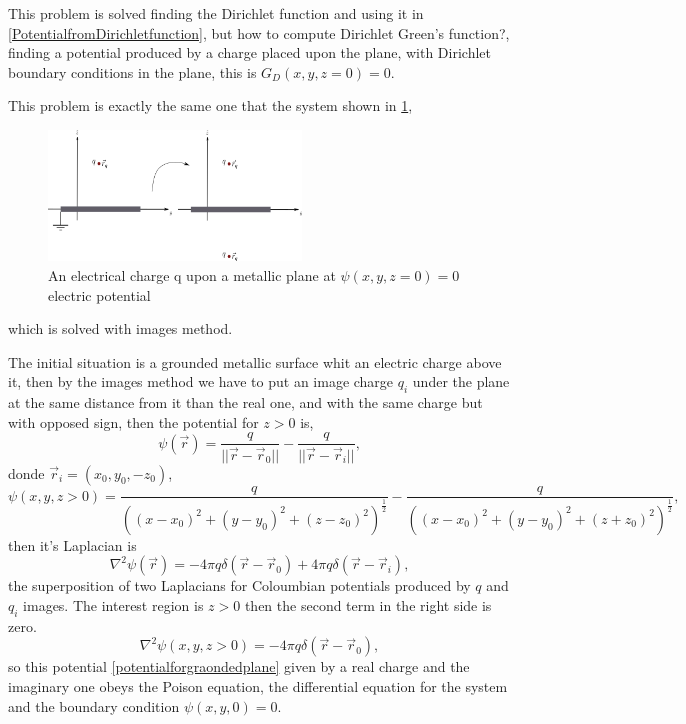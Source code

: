 \documentclass[12pt,a4paper]{article}
\begin{document}
This problem is solved finding the Dirichlet function and using it in \eqref{PotentialfromDirichletfunction}, but how to compute Dirichlet Green's function?, finding a potential produced by a charge placed upon the plane, with Dirichlet boundary conditions in the plane, this is $G_{D}(x,y,z=0)=0$.

This problem is exactly the same one that the system shown in \ref{Imagemethod},
 \begin{figure}
 	\centering
 	\includegraphics[width=0.6\textwidth]{figs/Imagemethod.png}
 	\caption{An electrical charge q upon a metallic plane at $\psi(x,y,z=0)=0$ electric potential}
 	\label{Imagemethod}
 \end{figure}
 which is solved with images method.

The initial situation is a grounded metallic surface whit an electric charge above it, then by the images method we have to put an image charge $q_{i}$ under the plane at the same distance from it than the real one, and with the same charge but with opposed sign, then the potential for $z>0$ is,
\begin{equation}
	\label{potentialforgraondedplane}
	\psi(\vec{r})=\frac{q}{||\vec{r}-\vec{r}_{0}||}-\frac{q}{||\vec{r}-\vec{r}_{i}||},
\end{equation}
donde $\vec{r}_{i}=(x_{0},y_{0},-z_{0})$,
\[\psi(x,y,z>0)=\frac{q}{((x-x_{0})^{2}+(y-y_{0})^{2}+(z-z_{0})^{2})^{\frac{1}{2}}}-\frac{q}{((x-x_{0})^{2}+(y-y_{0})^{2}+(z+z_{0})^{2})^{\frac{1}{2}}},\]
then it's Laplacian is
\begin{equation}
\nabla ^{2}\psi(\vec{r})=-4\pi q\delta(\vec{r}-\vec{r}_{0})+4\pi q\delta(\vec{r}-\vec{r}_{i}),
\end{equation}
the superposition of two Laplacians for Coloumbian potentials produced by $q$ and $q_{i}$ images. The interest region is $z>0$ then the second term in the right side is zero.
\begin{equation}
	\nabla ^{2}\psi(x,y,z>0)=-4\pi q\delta(\vec{r}-\vec{r}_{0}),
\end{equation}
so this potential \eqref{potentialforgraondedplane} given by a real charge and the imaginary one obeys the Poison equation, the differential equation for the system and the boundary condition $\psi(x,y,0)=0$.
\end{document}
